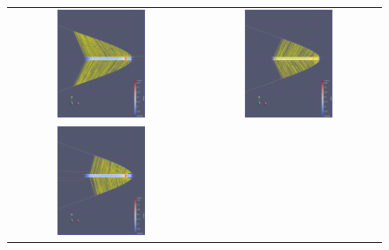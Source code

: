 \documentclass[a4paper,10pt]{article}
\begin{document}
    \begin{figure}
        \centering
        \begin{tabular}{c c}
            \includegraphics[width=0.5\textwidth]{images/open_pipe/1.png} &
            \includegraphics[width=0.5\textwidth]{images/open_pipe/2.png} \\
            \includegraphics[width=0.5\textwidth]{images/open_pipe/3.png} &

\end{tabular}
\end{figure}
\end{document}
